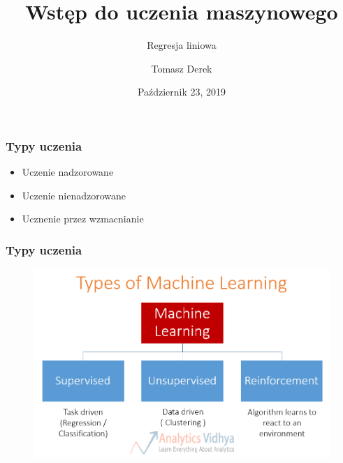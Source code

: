 \documentclass[17pt]{beamer}
\title{Wstęp do uczenia maszynowego}
\subtitle{Regresja liniowa}
\author{Tomasz Derek}
\institute{KMS}
\date{Październik 23, 2019}
\begin{document}
 
\frame{\titlepage}
 
\begin{frame}
\frametitle{Typy uczenia}
\begin{itemize}
\item Uczenie nadzorowane
\item Uczenie nienadzorowane
\item Ucznenie przez wzmacnianie
\end{itemize}
\end{frame} 
 
\begin{frame}
\frametitle{Typy uczenia}
\begin{figure}[ht]
\includegraphics[scale=0.25]{./ml_types.png}
\end{figure}
\end{frame}
\end{document}
